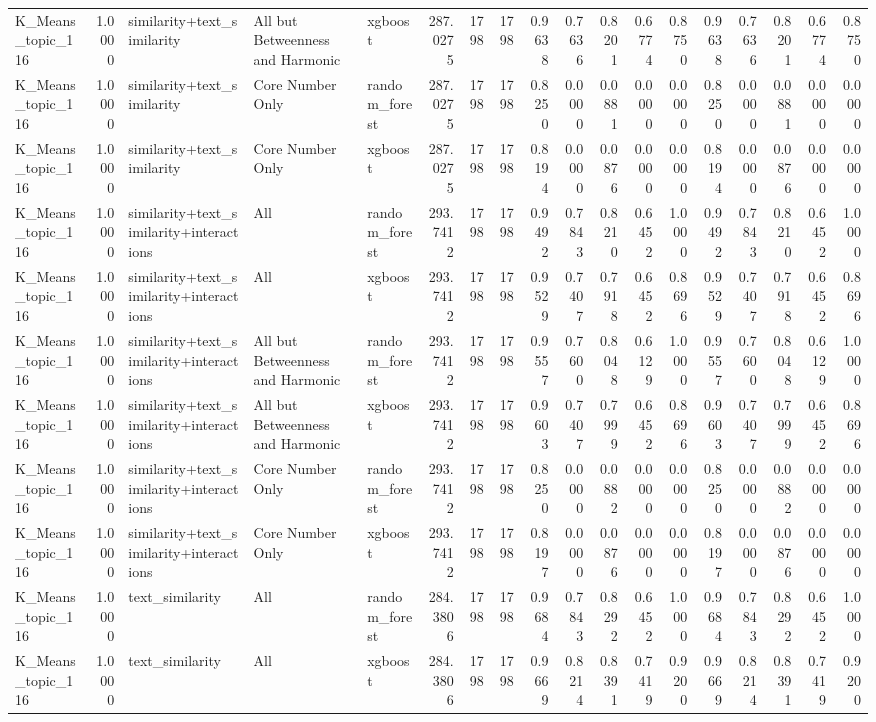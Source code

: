 \begin{tabular}{lrlllrrrrrrrrrrrrr}
K_Means_topic_116 & 1.0000 & similarity+text_similarity & All but Betweenness and Harmonic & xgboost & 287.0275 & 1798 & 1798 & 0.9638 & 0.7636 & 0.8201 & 0.6774 & 0.8750 & 0.9638 & 0.7636 & 0.8201 & 0.6774 & 0.8750 \\
K_Means_topic_116 & 1.0000 & similarity+text_similarity & Core Number Only & random_forest & 287.0275 & 1798 & 1798 & 0.8250 & 0.0000 & 0.0881 & 0.0000 & 0.0000 & 0.8250 & 0.0000 & 0.0881 & 0.0000 & 0.0000 \\
K_Means_topic_116 & 1.0000 & similarity+text_similarity & Core Number Only & xgboost & 287.0275 & 1798 & 1798 & 0.8194 & 0.0000 & 0.0876 & 0.0000 & 0.0000 & 0.8194 & 0.0000 & 0.0876 & 0.0000 & 0.0000 \\
K_Means_topic_116 & 1.0000 & similarity+text_similarity+interactions & All & random_forest & 293.7412 & 1798 & 1798 & 0.9492 & 0.7843 & 0.8210 & 0.6452 & 1.0000 & 0.9492 & 0.7843 & 0.8210 & 0.6452 & 1.0000 \\
K_Means_topic_116 & 1.0000 & similarity+text_similarity+interactions & All & xgboost & 293.7412 & 1798 & 1798 & 0.9529 & 0.7407 & 0.7918 & 0.6452 & 0.8696 & 0.9529 & 0.7407 & 0.7918 & 0.6452 & 0.8696 \\
K_Means_topic_116 & 1.0000 & similarity+text_similarity+interactions & All but Betweenness and Harmonic & random_forest & 293.7412 & 1798 & 1798 & 0.9557 & 0.7600 & 0.8048 & 0.6129 & 1.0000 & 0.9557 & 0.7600 & 0.8048 & 0.6129 & 1.0000 \\
K_Means_topic_116 & 1.0000 & similarity+text_similarity+interactions & All but Betweenness and Harmonic & xgboost & 293.7412 & 1798 & 1798 & 0.9603 & 0.7407 & 0.7999 & 0.6452 & 0.8696 & 0.9603 & 0.7407 & 0.7999 & 0.6452 & 0.8696 \\
K_Means_topic_116 & 1.0000 & similarity+text_similarity+interactions & Core Number Only & random_forest & 293.7412 & 1798 & 1798 & 0.8250 & 0.0000 & 0.0882 & 0.0000 & 0.0000 & 0.8250 & 0.0000 & 0.0882 & 0.0000 & 0.0000 \\
K_Means_topic_116 & 1.0000 & similarity+text_similarity+interactions & Core Number Only & xgboost & 293.7412 & 1798 & 1798 & 0.8197 & 0.0000 & 0.0876 & 0.0000 & 0.0000 & 0.8197 & 0.0000 & 0.0876 & 0.0000 & 0.0000 \\
K_Means_topic_116 & 1.0000 & text_similarity & All & random_forest & 284.3806 & 1798 & 1798 & 0.9684 & 0.7843 & 0.8292 & 0.6452 & 1.0000 & 0.9684 & 0.7843 & 0.8292 & 0.6452 & 1.0000 \\
K_Means_topic_116 & 1.0000 & text_similarity & All & xgboost & 284.3806 & 1798 & 1798 & 0.9669 & 0.8214 & 0.8391 & 0.7419 & 0.9200 & 0.9669 & 0.8214 & 0.8391 & 0.7419 & 0.9200 \\

\end{tabular}
